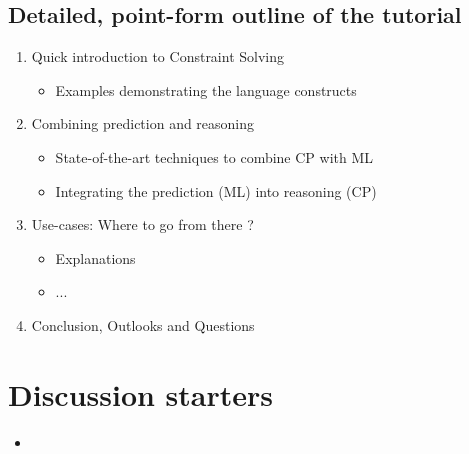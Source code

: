 \documentclass[letterpaper]{article} %
\begin{document}
\subsection{Detailed, point-form outline of the tutorial}
\begin{enumerate}
	\item Quick introduction to Constraint Solving 
	\begin{itemize}
		\item Examples demonstrating the language constructs
	\end{itemize}
	\item Combining prediction and reasoning
	\begin{itemize}
		\item State-of-the-art techniques to combine CP with ML
		\item Integrating the prediction (ML) into reasoning (CP)
	\end{itemize}
	\item Use-cases: Where to go from there ? 
	\begin{itemize}
		\item Explanations 
		\item ...
	\end{itemize}
	\item Conclusion, Outlooks and Questions
\end{enumerate}

\section{Discussion starters}

\begin{itemize}
	\item 
\end{itemize}

%
%
\end{document}
